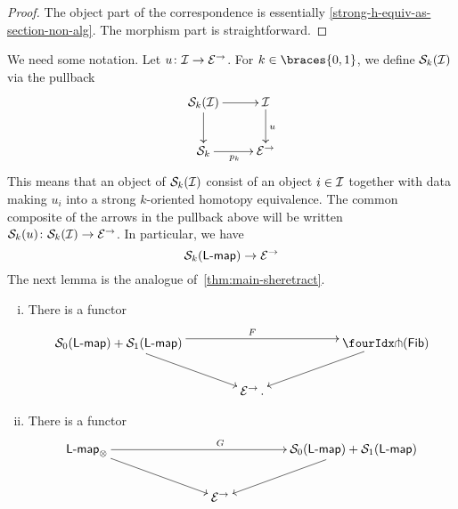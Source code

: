 \documentclass[reqno,10pt,a4paper,oneside,draft]{amsart}
\newcommand{\LL}{\mathsf{L}}
\begin{document}
{{\begin{proof} The object part of the correspondence is essentially \cref{strong-h-equiv-as-section-non-alg}. The morphism part is
straightforward. 
\end{proof}

We need some notation. Let $u \co \cal{I} \to \cal{E}^\to$. For $k \in \braces{0,1}$, we define $\cal{S}_k(\cal{I})$ via the pullback
\begin{equation}
\label{rel-strong-h-equiv-def}
\begin{gathered}
\xymatrix{
\cal{S}_k(\cal{I}) \ar[r] \ar[d] & \cal{I} \ar[d]^u \\
\cal{S}_k \ar[r]_{p_k} & \cal{E}^\to
}
\end{gathered}
\end{equation}
This means that an object of $\cal{S}_k(\cal{I})$ consist of an object $i \in \cal{I}$ together with data making $u_i$ into a 
strong $k$-oriented homotopy equivalence. The common composite of the arrows in the pullback above will be written
 $\cal{S}_k(u) \co \cal{S}_k(\cal{I}) \to \cal{E}^\to$. In particular, we have
\[
 \cal{S}_k(\pcoalg{\LL}) \to \cal{E}^\to
\]
The next lemma is the analogue of~\cref{thm:main-sheretract}.



\begin{proposition} \label{thm:strong-hequiv} \hfill 
\begin{enumerate}[(i)]
\item   \label{thm:onedir} There is a functor
\[
\xymatrix@!C@C-2.5em{
\cal{S}_0(\pcoalg{\LL}) + \cal{S}_1(\pcoalg{\LL})
  \ar[dr]
  \ar@<4pt>[rr]^F
&&
  \liftl{(\Fib)}
  \ar[dl]
\\&
  \catE^\to \, .
}
\]
\item  \label{thm:twodir} There is a functor
\[
\xymatrix@!C@C-2.5em{
    \pcoalg{\LL}_\otimes
  \ar[dr]
  \ar[rr]^G
&&
\cal{S}_0(\pcoalg{\LL}) + \cal{S}_1(\pcoalg{\LL})
  \ar[dl]
\\&
  \catE^\to
}
\]
\end{enumerate}
\end{proposition}

}}
\end{document}
